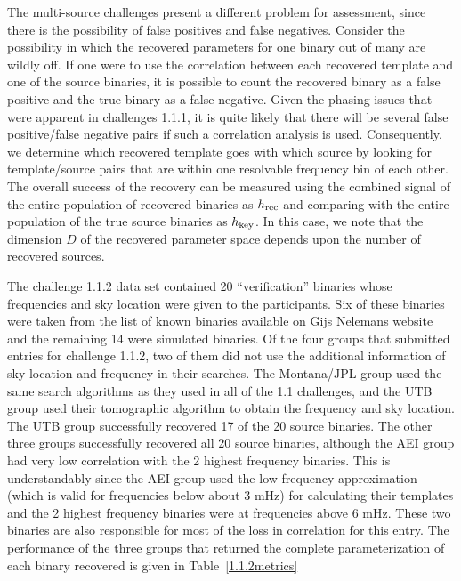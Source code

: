 \documentclass[12pt]{iopart}
\begin{document}
The multi-source challenges present a different problem for assessment, since there is the possibility of false positives and false negatives. Consider the possibility in which the recovered parameters for one binary out of many are wildly off. If one were to use the correlation between each recovered template and one of the source binaries, it is possible to count the recovered binary as a false positive and the true binary as a false negative. Given the phasing issues that were apparent in challenges 1.1.1, it is quite likely that there will be several false positive/false negative pairs if such a correlation analysis is used. Consequently, we determine which recovered template goes with which source by looking for template/source pairs that are within one resolvable frequency bin of each other. The overall success of the recovery can be measured using the combined signal of the entire population of recovered binaries as $h_{\rm rec}$ and comparing with the entire population of the true source binaries as $h_{\rm key}$. In this case, we note that the dimension $D$ of the recovered parameter space depends upon the number of recovered sources.

The challenge 1.1.2 data set contained 20 ``verification'' binaries whose frequencies and sky location were given to the participants. Six of these binaries were taken from the list of known binaries available on Gijs Nelemans website and the remaining 14 were simulated binaries. Of the four groups that submitted entries for challenge 1.1.2, two of them did not use the additional information of sky location and frequency in their searches. The Montana/JPL group used the same search algorithms as they used in all of the 1.1 challenges, and the UTB group used their tomographic algorithm to obtain the frequency and sky location. The UTB group successfully recovered 17 of the 20 source binaries. The other three groups successfully recovered all 20 source binaries, although the AEI group had very low correlation with the 2 highest frequency binaries. This is understandably since the AEI group used the low frequency approximation (which is valid for frequencies below about 3 mHz) for calculating their templates and the 2 highest frequency binaries were at frequencies above 6 mHz. These two binaries are also responsible for most of the loss in correlation for this entry. The performance of the three groups that returned the complete parameterization 
of each binary recovered is given in Table~\ref{1.1.2metrics}
\end{document}
